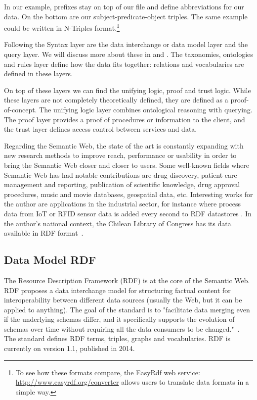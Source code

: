 In our example, prefixes stay on top of our file and define abbreviations for our data. On the bottom are our subject-predicate-object triples. The same example could be written in N-Triples format.\footnote{To see how these formats compare, the EasyRdf web service: \url{http://www.easyrdf.org/converter} allows users to translate data formats in a simple way.} 

Following the Syntax layer are the data interchange or data model layer and the query layer. We will discuss more about these in  and . The taxonomies, ontologies and rules layer define how the data fits together: relations and vocabularies are defined in these layers.

On top of these layers we can find the unifying logic, proof and trust logic. While these layers are not completely theoretically defined, they are defined as a proof-of-concept. The unifying logic layer combines ontological reasoning with querying. The proof layer provides a proof of procedures or information to the client, and the trust layer defines access control between services and data.

Regarding the Semantic Web, the state of the art is constantly expanding with new research methods to improve reach, performance or usability in order to bring the Semantic Web closer and closer to users. Some well-known fields where Semantic Web has had notable contributions are drug discovery, patient care management and reporting, publication of scientific knowledge, drug approval procedures, music and movie databases, geospatial data, etc. Interesting works for the author are applications in the industrial sector, for instance where process data from IoT or RFID sensor data is added every second to RDF datastores \cite{Zhang2018,Soylu2018,Kharlamov2016}. In the author's national context, the Chilean Library of Congress has its data available in RDF format~\cite{datosbcn}.



\subsection{Data Model RDF}
\label{chap:RDF}

The Resource Description Framework (RDF) \cite{rdfConcepts, rdfprimer11} is at the core of the Semantic Web. RDF proposes a data interchange model for structuring factual content for interoperability between different data sources (usually the Web, but it can be applied to anything). The goal of the standard is to "facilitate data merging even if the underlying schemas differ, and it specifically supports the evolution of schemas over time without requiring all the data consumers to be changed."~\cite{W3CRDF}. The standard defines RDF terms, triples, graphs and vocabularies. RDF is currently on version 1.1, published in 2014.

